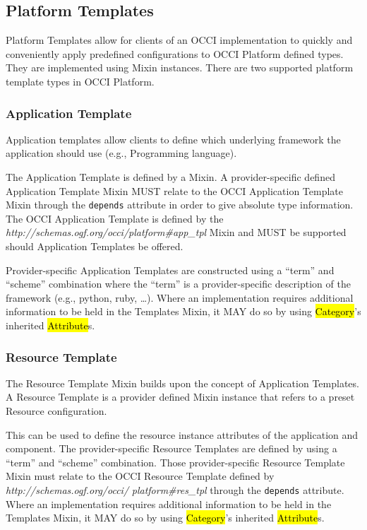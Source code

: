 \documentclass[10pt,a4paper]{article}
\begin{document}
\subsection{Platform Templates}
Platform Templates allow for clients of an OCCI implementation to quickly and conveniently apply predefined configurations to OCCI Platform defined types. They are implemented using Mixin instances. There are two supported platform template types in OCCI Platform.

\subsubsection{Application Template}
Application templates allow clients to define which underlying framework the application should use (e.g., Programming language).

The Application Template is defined by a Mixin. A provider-specific defined Application Template Mixin MUST relate to the OCCI Application Template Mixin through the \texttt{depends} attribute in order to give absolute type information. The OCCI Application Template is defined by the \textit{http://schemas.ogf.org/occi/platform\#app\_tpl} Mixin and MUST be supported should Application Templates be offered.

Provider-specific Application Templates are constructed using a ``term'' and ``scheme'' combination where the ``term'' is a provider-specific description of the framework (e.g., python, ruby, \dots{}). Where an implementation requires additional information to be held in the Templates Mixin, it MAY do so by using \hl{Category}’s inherited \hl{Attribute}s.

\subsubsection{Resource Template}
The Resource Template Mixin builds upon the concept of Application Templates. A Resource Template is a provider defined Mixin instance that refers to a preset Resource configuration.

This can be used to define the resource instance attributes of the application and component. The provider-specific Resource Templates are defined by using a ``term'' and ``scheme'' combination. Those provider-specific Resource Template Mixin must relate to the OCCI Resource Template defined by \textit{http://schemas.ogf.org/occi/} \textit{platform\#res\_tpl} through the \texttt{depends} attribute. Where an implementation requires additional information to be held in the Templates Mixin, it MAY do so by using \hl{Category}'s inherited \hl{Attribute}s.
\end{document}
